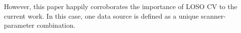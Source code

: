 However, this paper happily corroborates the importance of LOSO CV to the current work.
In this case, one data source is defined as a unique scanner-parameter combination.
